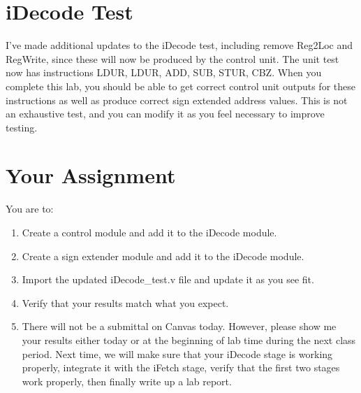 \section{iDecode Test}
I've made additional updates to the iDecode test, including remove Reg2Loc and RegWrite, since these will now be produced by the control unit.  The unit test now has instructions LDUR, LDUR, ADD, SUB, STUR, CBZ.  When you complete this lab, you should be able to get correct control unit outputs for these instructions as well as produce correct sign extended address values.  This is not an exhaustive test, and you can modify it as you feel necessary to improve testing.


\clearpage
\section{Your Assignment}

You are to:
\begin{enumerate}
\item Create a control module and add it to the iDecode module.
\item Create a sign extender module and add it to the iDecode module.
\item Import the updated iDecode\_test.v file and update it as you see fit.
\item Verify that your results match what you expect.
\item There will not be a submittal on Canvas today.  However, please show me your results either today or at the beginning of lab time during the next class period.  Next time, we will make sure that your iDecode stage is working properly, integrate it with the iFetch stage, verify that the first two stages work properly, then finally write up a lab report.
\end{enumerate} 